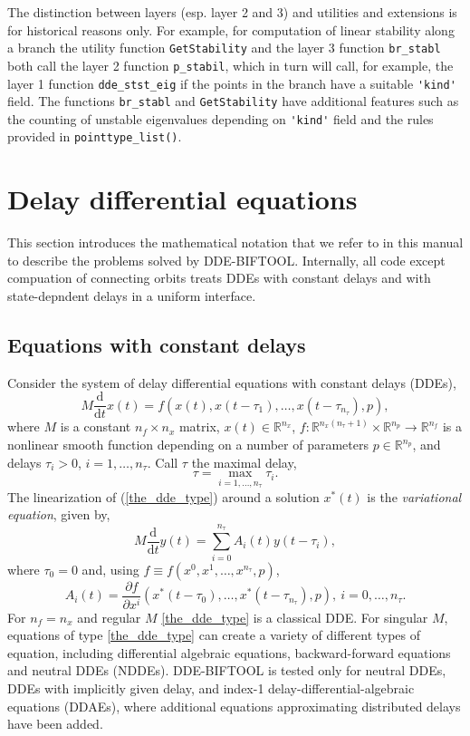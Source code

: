 \documentclass[10pt]{scrartcl}
\newcommand{\DDEBIFCODE}{\textsc{DDE-BIFTOOL}}
\newcommand{\define}[1]{\emph{#1}}
\renewcommand{\d}{\mathrm{d}}
\newcommand{\RR}{\mathbb{R}}
\newcommand{\blist}[1]{\mbox{\lstinline!#1!}}
\begin{document}
The distinction between layers (esp. layer 2 and 3) and utilities and
extensions is for historical reasons only. For example, for
computation of linear stability along a branch the utility function
\blist{GetStability} and the layer 3 function \blist{br_stabl} both
call the layer 2 function \blist{p_stabil}, which in turn will call,
for example, the layer 1 function \blist{dde_stst_eig} if the points
in the branch have a suitable \blist{'kind'} field. The functions
\blist{br_stabl} and \blist{GetStability} have additional features
such as the counting of unstable eigenvalues depending on
\blist{'kind'} field and the rules provided in
\blist{pointtype_list()}.


\section{Delay differential equations}\label{explain_dde}
\label{sec:ddes}
This section introduces the mathematical notation that we refer to in
this manual to describe the problems solved by
\DDEBIFCODE{}. Internally, all code except compuation of connecting
orbits treats DDEs with constant delays and with state-depndent delays
in a uniform interface.
\subsection{Equations with constant delays}\label{dde}

Consider the system of delay differential equations with constant
delays (DDEs),
\begin{equation}\label{the_dde_type}
M\frac{\d}{\d t}{x(t)}=f(x(t),x(t-\tau_1),\ldots,x(t-\tau_{n_\tau}),p),
\end{equation}
where $M$ is a constant $n_f\times n_x$ matrix, $x(t)\in\RR^{n_x}$,
$f:\RR^{n_x(n_\tau+1)}\times\RR^{n_p} \rightarrow\RR^{n_f}$ is a nonlinear smooth
function depending on a number of parameters $p\in\RR^{n_p}$, and
delays $\tau_i>0$, $i=1,\ldots,n_\tau$.  Call $\tau$ the maximal delay,
\[
\tau=\max_{i=1,\ldots,n_\tau}\tau_i.
\]
The linearization of (\ref{the_dde_type}) around a solution $x^*(t)$ 
is the \define{variational equation}, given by,
\begin{equation}\label{the_var_equa}
M\frac{\d}{\d t}{y(t)}=\sum_{i=0}^{n_\tau} A_i(t)y(t-\tau_i),
\end{equation}
where $\tau_0=0$ and, using $f\equiv f(x^0,x^1,\ldots,x^{n_\tau},p)$,  
\begin{equation}\label{A_def}
A_i(t)=\frac{\partial f}{\partial x^i}(x^*(t-\tau_0),\ldots,x^*(t-\tau_{n_\tau}),p), 
\ i=0,\ldots,n_\tau. 
\end{equation}
For  $n_f=n_x$ and regular $M$ \cref{the_dde_type} is a classical
DDE. For singular $M$, equations of type \eqref{the_dde_type} can
create a variety of different types of equation, including
differential algebraic equations, backward-forward equations and
neutral DDEs (NDDEs). \DDEBIFCODE{} is tested only for neutral DDEs,
DDEs with implicitly given delay, and index-1
delay-differential-algebraic equations (DDAEs), where additional
equations approximating distributed delays have been added.
\end{document}
